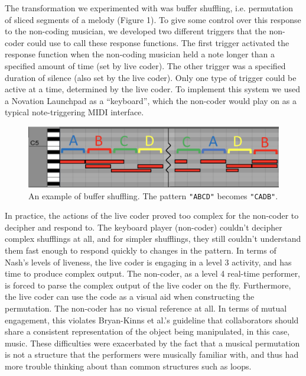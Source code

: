 \documentclass{nime-alternate}
\begin{document}
The transformation we experimented with was buffer shuffling, i.e. permutation of sliced segments of a melody (Figure 1). To give some control over this response to the non-coding musician, we developed two different triggers that the non-coder could use to call these response functions. The first trigger activated the response function when the non-coding musician held a note longer than a specified amount of time (set by live coder). The other trigger was a specified duration of silence (also set by the live coder). Only one type of trigger could be active at a time, determined by the live coder. To implement this system we used a Novation Launchpad as a ``keyboard'', which the non-coder would play on as a typical note-triggering MIDI interface. 

\begin{figure}[htbp]
	\centering
		\includegraphics[width=1\columnwidth]{BufferShuffling2}
	\caption{An example of buffer shuffling. The pattern \texttt{"ABCD"} becomes \texttt{"CADB"}.}
	\label{fig:BufferShuffling2}
\end{figure}

In practice, the actions of the live coder proved too complex for the non-coder to decipher and respond to. The keyboard player (non-coder) couldn't decipher complex shufflings at all, and for simpler shufflings, they still couldn't understand them fast enough to respond quickly to changes in the pattern. In terms of Nash's levels of liveness, the live coder is engaging in a level 3 activity, and has time to produce complex output. The non-coder, as a level 4 real-time performer, is forced to parse the complex output of the live coder on the fly. Furthermore, the live coder can use the code as a visual aid when constructing the permutation. The non-coder has no visual reference at all. In terms of mutual engagement, this violates Bryan-Kinns et al.'s guideline that collaborators should share a consistent representation of the object being manipulated, in this case, music. These difficulties were exacerbated by the fact that a musical permutation is not a structure that the performers were musically familiar with, and thus had more trouble thinking about than common structures such as loops.
\end{document}

